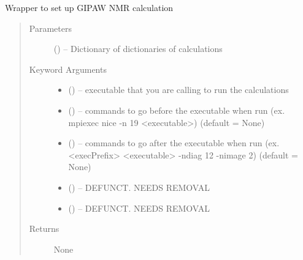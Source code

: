 \documentclass[letterpaper,10pt,english]{sphinxmanual}
\begin{document}
\begin{fulllineitems}
\label{\detokenize{run:run.nmr}}
Wrapper to set up GIPAW NMR calculation
\begin{quote}\begin{description}
\item[{Parameters}] \leavevmode
{} () -- Dictionary of dictionaries of calculations

\item[{Keyword Arguments}] \leavevmode\begin{itemize}
\item {} 
 () -- executable that you are calling to run the calculations

\item {} 
 () -- commands to go before the executable when run
(ex. mpiexec nice -n 19 \textless{}executable\textgreater{}) (default = None)

\item {} 
 () -- commands to go after the executable when run
(ex. \textless{}execPrefix\textgreater{} \textless{}executable\textgreater{} -ndiag 12 -nimage 2) (default = None)

\item {} 
 () -- DEFUNCT. NEEDS REMOVAL

\item {} 
 () -- DEFUNCT. NEEDS REMOVAL

\end{itemize}

\item[{Returns}] \leavevmode
None

\end{description}\end{quote}

\end{fulllineitems}

\end{document}
